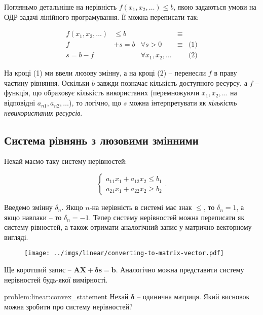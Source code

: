 \documentclass[\main/book.tex]{subfiles}
\begin{document}
Погляньмо детальніше на нерівність $f(x_1, x_2, \ldots) \leq b$, якою задаються умови на ОДР задачі лінійного програмування. Її можна переписати так:
 
\[
 \begin{array}{lrlll}
  f(x_1, x_2, \ldots) &  \leq b &                         & \equiv &            \\
  f                   & + s = b & \forall s > 0           & \equiv & \text{(1)} \\
  s = b - f           &         & \forall x_1, x_2, \ldots &        & \text{(2)}
 \end{array}
\]

На кроці (1) ми ввели люзову змінну, а на кроці (2) -- перенесли $f$ в праву частину рівняння. Оскільки $b$ завжди позначає кількість доступного ресурсу, а $f$ -- функція, що обраховує кількість використаних (перемножуючи $x_1, x_2, \ldots$ на відповідні $a_{n1}, a_{n2}, \ldots$), то логічно, що $s$ можна інтерпретувати як \textit{кількість невикористаних ресурсів}.

\subsection{Система рівнянь з люзовими змінними}

Нехай маємо таку систему нерівностей:

\[
 \left\{
  \begin{array}{l}
   a_{11} x_1 + a_{12} x_2 \leq b_1 \\
   a_{21} x_1 + a_{22} x_2 \geq b_2
  \end{array}
 \right. .
\]

Введемо змінну $\delta_n$. Якщо $n$-на нерівність в системі має знак \flqq{}$\leq$\frqq{}, то $\delta_n=1$, а якщо навпаки -- то $\delta_n=-1$. Тепер систему нерівностей можна переписати як систему рівностей, а також отримати аналогічний запис у матрично-векторному-вигляді.

\begin{figure}[!h]
 \center
 \texttt{[image: ../imgs/linear/converting-to-matrix-vector.pdf]}
\end{figure}

Ще коротший запис -- $\mathbf{A} \mathbf{X} + \mathbf{\delta} \mathbf{s} = \mathbf{b}$. Аналогічно можна представити систему нерівностей будь-якої вимірності.

\begin{problem}{problem:linear:convex_statement}
 Нехай $\mathbf{\delta}$ -- одинична матриця. Який висновок можна зробити про систему нерівностей?
\end{problem}
\end{document}
